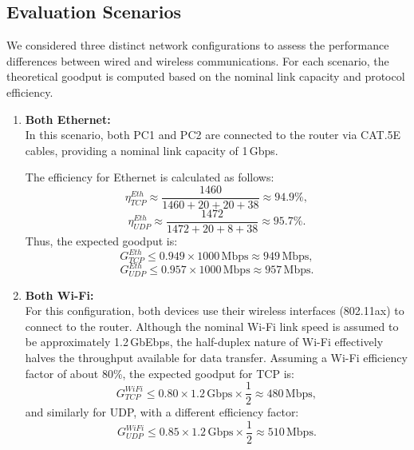     \subsection{Evaluation Scenarios} \label{subsec:evaluation-scenarios}

        We considered three distinct network configurations to assess the performance differences between wired and wireless communications. 
        For each scenario, the theoretical goodput is computed based on the nominal link capacity and protocol efficiency.

        \begin{enumerate}

            \item \textbf{Both Ethernet:} \\
            In this scenario, both PC1 and PC2 are connected to the router via CAT.5E cables, providing a nominal link capacity of 1\,Gbps. 

            \noindent The efficiency for Ethernet is calculated as follows:
            \[
            \eta_{TCP}^{Eth} \approx \frac{1460}{1460 + 20 + 20 + 38} \approx 94.9\%,
            \]
            \[
            \eta_{UDP}^{Eth} \approx \frac{1472}{1472 + 20 + 8 + 38} \approx 95.7\%.
            \]
            Thus, the expected goodput is:
            \[
            G_{TCP}^{Eth} \leq 0.949 \times 1000\,\text{Mbps} \approx 949\,\text{Mbps},
            \]
            \[
            G_{UDP}^{Eth} \leq 0.957 \times 1000\,\text{Mbps} \approx 957\,\text{Mbps}.
            \]

            \vspace{0.2cm} %

            \item \textbf{Both Wi-Fi:} \\
            For this configuration, both devices use their wireless interfaces (802.11ax) to connect to the router. 
            Although the nominal Wi-Fi link speed is assumed to be approximately 1.2\,GbEbps, the half-duplex nature of Wi-Fi effectively halves the throughput available for data transfer. 
            Assuming a Wi-Fi efficiency factor of about 80\%, the expected goodput for TCP is:
            \[
            G_{TCP}^{WiFi} \leq 0.80 \times 1.2\,\text{Gbps} \times \frac{1}{2} \approx 480\,\text{Mbps},
            \]
            and similarly for UDP, with a different efficiency factor:
            \[
            G_{UDP}^{WiFi} \leq 0.85 \times 1.2\,\text{Gbps} \times \frac{1}{2} \approx 510\,\text{Mbps}.
            \]


\end{enumerate}
